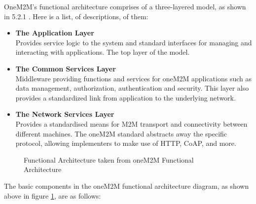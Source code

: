 OneM2M's functional architecture comprises of a three-layered model, as shown in 5.2.1 \cite{oneM2M2016OneM2MArchitecture}. Here is a list, of descriptions, of them:

\begin{itemize}
  \item \textbf{The Application Layer}\\
  Provides service logic to the system and standard interfaces for managing and interacting with applications. The top layer of the model.
  \item \textbf{The Common Services Layer}\\ Middleware providing functions and services for oneM2M applications such as data management, authorization, authentication and security. This layer also provides a standardized link from application to the underlying network.  
  \item \textbf{The Network Services Layer}\\
  Provides a standardised means for M2M transport and connectivity between different machines. The oneM2M standard abstracts away the specific protocol, allowing implementers to make use of HTTP, CoAP, and more.
\end{itemize}

\begin{figure}[H]
\centering
{}
\caption[Functional Architecture]{Functional Architecture taken from oneM2M Functional Architecture \cite{oneM2M2016OneM2MArchitecture}}
\label{fig:fa}
\end{figure}

The basic components in the oneM2M functional architecture diagram, as shown above in figure \ref{fig:fa}, are as follows:

